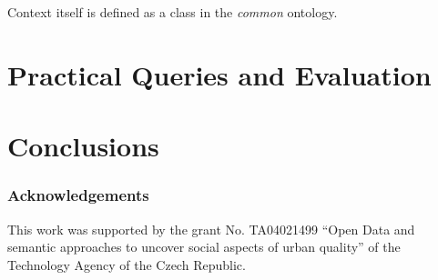 \documentclass{lncs-template/llncs}
\begin{document}
Context itself is defined as a class in the \textit{common} ontology.




\section{Practical Queries and Evaluation}






\section{Conclusions}

\subsubsection*{Acknowledgements}\label{sec:ack}
\noindent This work was supported by the grant No. TA04021499 ``Open Data and semantic approaches to uncover social aspects of urban quality'' of the Technology Agency of the Czech Republic.



\end{document}
